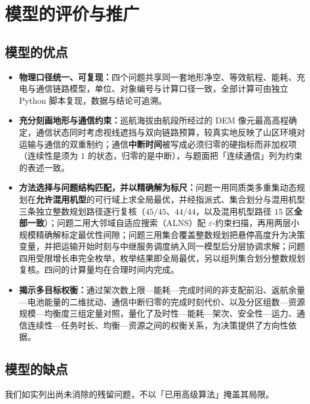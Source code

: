 \section{模型的评价与推广}
\label{sec:evaluation}

\subsection{模型的优点}

\begin{itemize}
	\item \textbf{物理口径统一、可复现：}四个问题共享同一套地形净空、等效航程、能耗、充电与通信链路模型，单位、对象编号与计算口径一致，全部计算可由独立 Python 脚本复现，数据与结论可追溯。
	\item \textbf{充分刻画地形与通信约束：}巡航海拔由航段所经过的 DEM 像元最高高程确定，通信状态同时考虑视线遮挡与双向链路预算，较真实地反映了山区环境对运输与通信的双重制约；通信\textbf{中断时间}被写成必须归零的硬指标而非加权项（连续性是须为 $1$ 的状态，归零的是中断），与题面把「连续通信」列为约束的表述一致。
	\item \textbf{方法选择与问题结构匹配，并以精确解为标尺：}问题一用同质类多重集动态规划在\textbf{允许混用机型}的可行域上求全局最优，并经指派式、集合划分与混用机型三条独立整数规划路径逐行复核（$45/45$、$44/44$，以及混用机型路径 $15$ 区\textbf{全部一致}）；问题二用大邻域自适应搜索（ALNS）配 $\varepsilon$-约束扫描，再用两层小规模精确解标定最优性间隙；问题三用集合覆盖整数规划把悬停高度升为决策变量，并把运输开始时刻与中继服务调度纳入同一模型后分层协调求解；问题四用受限增长串完全枚举，枚举结果即全局最优，另以组列集合划分整数规划复核。四问的计算量均在合理时间内完成。
	\item \textbf{揭示多目标权衡：}通过架次数上限—能耗—完成时间的非支配前沿、返航余量—电池能量的二维扰动、通信中断归零的完成时刻代价、以及分区组数—资源规模—均衡度三组定量对照，量化了及时性—能耗—架次、安全性—运力、通信连续性—任务时长、均衡—资源之间的权衡关系，为决策提供了方向性依据。
\end{itemize}

\subsection{模型的缺点}

我们如实列出尚未消除的残留问题，不以「已用高级算法」掩盖其局限。

